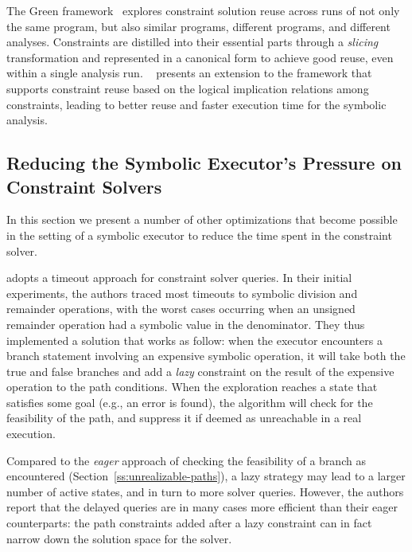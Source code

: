 The Green framework~\cite{GREEN-FSE12} explores constraint solution reuse across runs of not only the same program, but also similar programs, different programs, and different analyses. Constraints are distilled into their essential parts through a {\em slicing} transformation and represented in a canonical form to achieve good reuse, even within a single analysis run. ~\cite{JGY-ISSTA15} presents an extension to the framework that supports constraint reuse based on the logical implication relations among constraints, leading to better reuse and faster execution time for the symbolic analysis.

\subsection{Reducing the Symbolic Executor's Pressure on Constraint Solvers}
\label{ss:reducing-constraint-solver-pressure}

In this section we present a number of other optimizations that become possible in the setting of a symbolic executor to reduce the time spent in the constraint solver.

\cite{UCKLEE-USEC15} adopts a timeout approach for constraint solver queries. In their initial experiments, the authors traced most timeouts to symbolic division and remainder operations, with the worst cases occurring when an unsigned remainder operation had a symbolic value in the denominator.
They thus implemented a solution that works as follow: when the executor encounters a branch statement involving an expensive symbolic operation, it will take both the true and false branches and add a {\em lazy} constraint on the result of the expensive operation to the path conditions. When the exploration reaches a state that satisfies some goal (e.g., an error is found), the algorithm will check for the feasibility of the path, and suppress it if deemed as unreachable in a real execution.

Compared to the {\em eager} approach of checking the feasibility of a branch as encountered (Section~\ref{ss:unrealizable-paths}), a lazy strategy may lead to a larger number of active states, and in turn to more solver queries. However, the authors report that the delayed queries are in many cases more efficient than their eager counterparts: the path constraints added after a lazy constraint can in fact narrow down the solution space for the solver.

